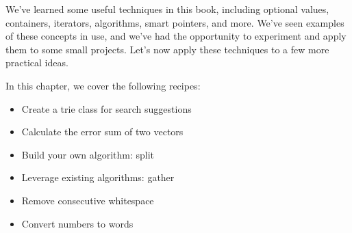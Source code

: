 We've learned some useful techniques in this book, including optional values, containers, iterators, algorithms, smart pointers, and more. We've seen examples of these concepts in use, and we've had the opportunity to experiment and apply them to some small projects. Let's now apply these techniques to a few more practical ideas.

In this chapter, we cover the following recipes:

\begin{itemize}
\item 
Create a trie class for search suggestions

\item 
Calculate the error sum of two vectors

\item 
Build your own algorithm: split

\item 
Leverage existing algorithms: gather

\item 
Remove consecutive whitespace

\item 
Convert numbers to words
\end{itemize}